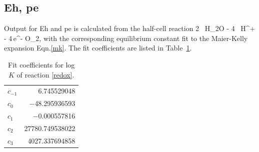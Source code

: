 \subsection{Eh, pe}

Output for Eh and pe is calculated from the half-cell reaction
\EQ\label{redox}
\rm 2 \, H_2O - 4 \, H^+ - 4\,e^- \arrows \rm O_2,
\EN
with the corresponding equilibrium constant fit to the Maier-Kelly expansion Eqn.\eqref{mk}. The fit coefficients are listed in Table~\ref{tmkfit}.

\begin{table}[H]\centering
\caption{Fit coefficients for log $K$ of reaction \ref{redox}.}
\label{tmkfit}
\vspace{3mm}
\begin{tabular}{lr}
\toprule
$c_{-1}$ & 6.745529048\\
$c_0$ & $-$48.295936593\\
$c_1$ & $-$0.000557816\\
$c_2$ & 27780.749538022\\
$c_3$ & 4027.337694858\\
\bottomrule
\end{tabular}
\end{table}


